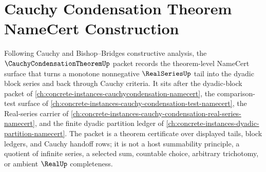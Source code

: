 \chapter{Cauchy Condensation Theorem NameCert Construction}
\label{ch:concrete-instances-cauchy-condensation-theorem-namecert}

Following Cauchy and Bishop--Bridges constructive analysis, the $\CauchyCondensationTheoremUp$ packet records the theorem-level NameCert surface that turns a monotone nonnegative $\RealSeriesUp$ tail into the dyadic block series and back through Cauchy criteria. It sits after the dyadic-block packet of \autoref{ch:concrete-instances-cauchycondensation-namecert}, the comparison-test surface of \autoref{ch:concrete-instances-cauchy-condensation-test-namecert}, the Real-series carrier of \autoref{ch:concrete-instances-cauchy-condensation-real-series-namecert}, and the finite dyadic partition ledger of \autoref{ch:concrete-instances-dyadic-partition-namecert}. The packet is a theorem certificate over displayed tails, block ledgers, and Cauchy handoff rows; it is not a host summability principle, a quotient of infinite series, a selected sum, countable choice, arbitrary trichotomy, or ambient $\RealUp$ completeness.

